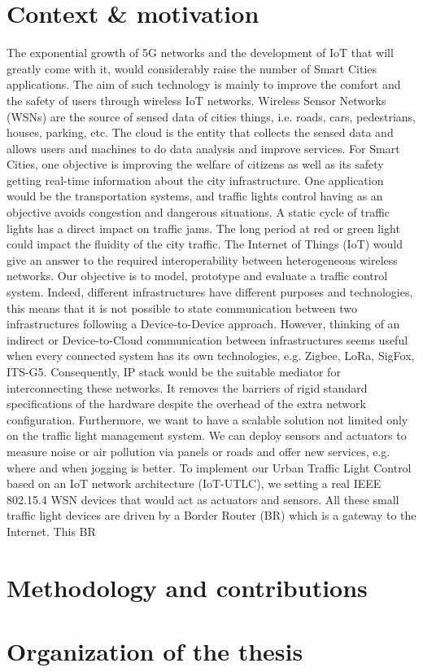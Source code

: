 \section{Context \& motivation}


The exponential growth of 5G networks and the development of IoT that will greatly come with it,
	would considerably raise the number of Smart Cities applications.
The aim of such technology is mainly to improve the comfort and the safety of users through wireless IoT networks.
Wireless Sensor Networks (WSNs) are the source of sensed data of cities things,
	i.e.
roads,
	cars,
	pedestrians,
	houses,
	parking,
	etc.
The cloud is the entity that collects the sensed data and allows users and machines to do data analysis and improve services.
For Smart Cities,
	one objective is improving the welfare of citizens as well as its safety getting real-time information about the city infrastructure.
One application would be the transportation systems,
	and traffic lights control having as an objective avoids congestion and dangerous situations.
A static cycle of traffic lights has a direct impact on traffic jams.
The long period at red or green light could impact the fluidity of the city traffic.
The Internet of Things (IoT) would give an answer to the required interoperability between heterogeneous wireless networks.
Our objective is to model,
	prototype and evaluate a traffic control system.
Indeed,
	different infrastructures have different purposes and technologies,
	this means that it is not possible to state communication between two infrastructures following a Device-to-Device approach.
However,
	thinking of an indirect or Device-to-Cloud communication between infrastructures seems useful when every connected system has its own technologies,
	e.g.
Zigbee,
	LoRa,
	SigFox,
	ITS-G5.
Consequently,
	IP stack would be the suitable mediator for interconnecting these networks.
It removes the barriers of rigid standard specifications of the hardware despite the overhead of the extra network configuration.
Furthermore,
	we want to have a scalable solution not limited only on the traffic light management system.
We can deploy sensors and actuators to measure noise or air pollution via panels or roads and offer new services,
	e.g.
where and when jogging is better.
To implement our Urban Traffic Light Control based on an IoT network architecture (IoT-UTLC),
	we setting a real IEEE 802.15.4 WSN devices that would act as actuators and sensors.
All these small traffic light devices are driven by a Border Router (BR) which is a gateway to the Internet.
This BR 

\section{Methodology and contributions}

\section{Organization of the thesis}




